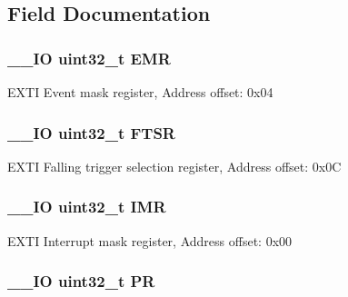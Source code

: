\subsection{Field Documentation}
\hypertarget{struct_e_x_t_i___type_def_a6034c7458d8e6030f6dacecf0f1a3a89}{
\subsubsection[{E\-M\-R}]{\setlength{\rightskip}{0pt plus 5cm}\-\_\-\-\_\-\-I\-O uint32\-\_\-t E\-M\-R}}\label{struct_e_x_t_i___type_def_a6034c7458d8e6030f6dacecf0f1a3a89}
E\-X\-T\-I Event mask register, Address offset\-: 0x04 \hypertarget{struct_e_x_t_i___type_def_aa0f7c828c46ae6f6bc9f66f11720bbe6}{
\subsubsection[{F\-T\-S\-R}]{\setlength{\rightskip}{0pt plus 5cm}\-\_\-\-\_\-\-I\-O uint32\-\_\-t F\-T\-S\-R}}\label{struct_e_x_t_i___type_def_aa0f7c828c46ae6f6bc9f66f11720bbe6}
E\-X\-T\-I Falling trigger selection register, Address offset\-: 0x0\-C \hypertarget{struct_e_x_t_i___type_def_ae845b86e973b4bf8a33c447c261633f6}{
\subsubsection[{I\-M\-R}]{\setlength{\rightskip}{0pt plus 5cm}\-\_\-\-\_\-\-I\-O uint32\-\_\-t I\-M\-R}}\label{struct_e_x_t_i___type_def_ae845b86e973b4bf8a33c447c261633f6}
E\-X\-T\-I Interrupt mask register, Address offset\-: 0x00 \hypertarget{struct_e_x_t_i___type_def_af8d25514079514d38c104402f46470af}{
\subsubsection[{P\-R}]{\setlength{\rightskip}{0pt plus 5cm}\-\_\-\-\_\-\-I\-O uint32\-\_\-t P\-R}}\label{struct_e_x_t_i___type_def_af8d25514079514d38c104402f46470af}
